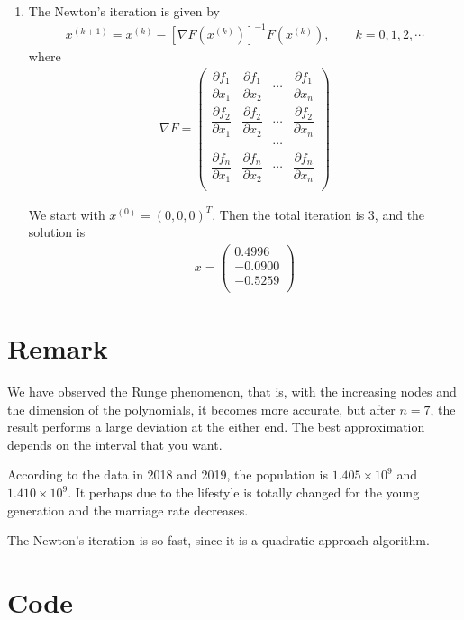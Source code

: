 \documentclass[a4paper,11pt]{article}
\begin{document}
\begin{enumerate}
    \item The Newton's iteration is given by 
    \begin{eqnarray}
        x^{(k+1)}=x^{(k)}-[\nabla F(x^{(k)})]^{-1}F(x^{(k)}),\quad\quad k=0,1,2,\dotsm
    \end{eqnarray}
    where
    \begin{eqnarray}
        \nabla F = \begin{pmatrix}
            \dfrac{\partial f_1}{\partial x_1}&\dfrac{\partial f_1}{\partial x_2}&\dotsm&\dfrac{\partial f_1}{\partial x_n}\\
            \dfrac{\partial f_2}{\partial x_1}&\dfrac{\partial f_2}{\partial x_2}&\dotsm&\dfrac{\partial f_2}{\partial x_n}\\
            &&\dotsm&\\
            \dfrac{\partial f_n}{\partial x_1}&\dfrac{\partial f_n}{\partial x_2}&\dotsm&\dfrac{\partial f_n}{\partial x_n}\\
        \end{pmatrix}
    \end{eqnarray}

    We start with $x^{(0)}=(0,0,0)^T$. Then the total iteration is 3, and the solution is
    \begin{eqnarray}
        x=\begin{pmatrix}
            0.4996\\
            -0.0900\\
            -0.5259\\
        \end{pmatrix}
    \end{eqnarray}
\end{enumerate}

\section{Remark}
We have observed the Runge phenomenon, that is, with the increasing nodes and the dimension of the polynomials, it becomes more accurate, but after $n=7$, the result performs a large deviation at the either end. The best approximation depends on the interval that you want.

According to the data in 2018 and 2019, the population is $1.405\times 10^{9}$ and $1.410\times 10^{9}$. It perhaps due to the lifestyle is totally changed for the young generation and the marriage rate decreases. 

The Newton's iteration is so fast, since it is a quadratic approach algorithm.
\section{Code}



\end{document}
